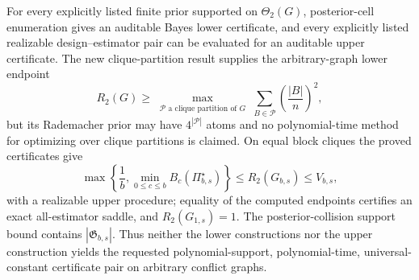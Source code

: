 For every explicitly listed finite prior supported on \(\Theta_2(G)\), posterior-cell enumeration gives an auditable Bayes lower certificate, and every explicitly listed realizable design--estimator pair can be evaluated for an auditable upper certificate. The new clique-partition result supplies the arbitrary-graph lower endpoint
\[
R_2(G)\geq
\max_{\substack{\mathcal P\text{ a clique partition of }G}}
\sum_{B\in\mathcal P}\left(\frac{|B|}{n}\right)^2,
\]
but its Rademacher prior may have \(4^{|\mathcal P|}\) atoms and no polynomial-time method for optimizing over clique partitions is claimed. On equal block cliques the proved certificates give
\[
\max\left\{\frac1b,\min_{0\leq c\leq b}B_c(\Pi_{b,s}^{\star})\right\}
\leq R_2(G_{b,s})\leq V_{b,s},
\]
with a realizable upper procedure; equality of the computed endpoints certifies an exact all-estimator saddle, and \(R_2(G_{1,s})=1\). The posterior-collision support bound contains \(|\mathfrak G_{b,s}|\). Thus neither the lower constructions nor the upper construction yields the requested polynomial-support, polynomial-time, universal-constant certificate pair on arbitrary conflict graphs.